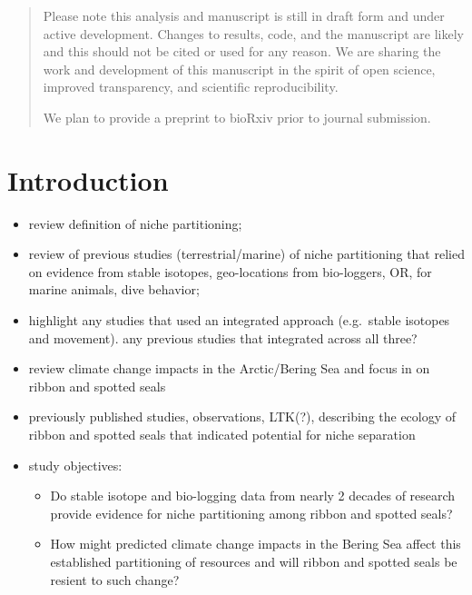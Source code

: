 \documentclass[
  authoryear,
  preprint,
  3p,
  onecolumn]{elsarticle}
\providecommand{\tightlist}{%
  \setlength{\itemsep}{0pt}\setlength{\parskip}{0pt}}\usepackage{longtable,booktabs,array}
\begin{document}
\begin{frontmatter}
\begin{abstract}
\begin{tcolorbox}[enhanced jigsaw, toptitle=1mm, leftrule=.75mm, rightrule=.15mm, title={Under Development. Please do not cite or use}, bottomrule=.15mm, opacitybacktitle=0.6, opacityback=0, colframe=quarto-callout-warning-color-frame, colbacktitle=quarto-callout-warning-color!10!white, arc=.35mm, bottomtitle=1mm, breakable, titlerule=0mm, colback=white, toprule=.15mm, coltitle=black, left=2mm]

Please note this analysis and manuscript is still in draft form and
under active development. Changes to results, code, and the manuscript
are likely and this should not be cited or used for any reason. We are
sharing the work and development of this manuscript in the spirit of
open science, improved transparency, and scientific reproducibility.

We plan to provide a preprint to bioRxiv prior to journal submission.

\end{tcolorbox}
\end{abstract}





\end{frontmatter}
    
\section{Introduction}\label{introduction}

\begin{itemize}
\tightlist
\item
  review definition of niche partitioning;
\item
  review of previous studies (terrestrial/marine) of niche partitioning
  that relied on evidence from stable isotopes, geo-locations from
  bio-loggers, OR, for marine animals, dive behavior;
\item
  highlight any studies that used an integrated approach (e.g.~stable
  isotopes and movement). any previous studies that integrated across
  all three?
\item
  review climate change impacts in the Arctic/Bering Sea and focus in on
  ribbon and spotted seals
\item
  previously published studies, observations, LTK(?), describing the
  ecology of ribbon and spotted seals that indicated potential for niche
  separation
\item
  study objectives:

  \begin{itemize}
  \tightlist
  \item
    Do stable isotope and bio-logging data from nearly 2 decades of
    research provide evidence for niche partitioning among ribbon and
    spotted seals?
  \item
    How might predicted climate change impacts in the Bering Sea affect
    this established partitioning of resources and will ribbon and
    spotted seals be resient to such change?
  \end{itemize}
\end{itemize}
\end{document}
